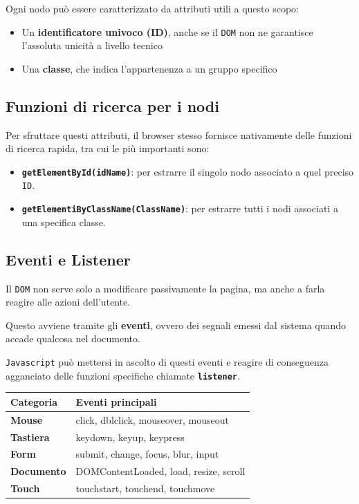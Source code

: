 Ogni nodo può essere caratterizzato da attributi utili a questo scopo:

\begin{itemize}
    \item Un \textbf{identificatore univoco (ID)}, anche se il \texttt{DOM} non ne garantisce l'assoluta unicità a livello tecnico
    \item Una \textbf{classe}, che indica l'appartenenza a un gruppo specifico
\end{itemize}

\subsection{Funzioni di ricerca per i nodi}
Per sfruttare questi attributi, il browser stesso fornisce nativamente delle funzioni di ricerca rapida, tra cui le più importanti sono:

\begin{itemize}
    \item \textbf{\texttt{getElementById(idName)}}: per estrarre il singolo nodo associato a quel preciso \texttt{ID}.
    \item \textbf{\texttt{getElementiByClassName(ClassName)}}: per estrarre tutti i nodi associati a una specifica classe.
\end{itemize}

\subsection{Eventi e Listener}
Il \texttt{DOM} non serve solo a modificare passivamente la pagina, ma anche a farla reagire alle azioni dell'utente.

Questo avviene tramite gli \textbf{eventi}, ovvero dei segnali emessi dal sistema quando accade qualcosa nel documento.

\texttt{Javascript} può mettersi in ascolto di questi eventi e reagire di conseguenza agganciato delle funzioni specifiche chiamate \textbf{\texttt{listener}}.

\begin{table}[htbp]
    \centering
    \renewcommand{\arraystretch}{1.5} %
    
    \begin{tabularx}{\textwidth}{|l|X|}
        \hline
        \textbf{Categoria} & \textbf{Eventi principali} \\ \hline
        \textbf{Mouse} & click, dblclick, mouseover, mouseout \\ \hline
        \textbf{Tastiera} & keydown, keyup, keypress \\ \hline
        \textbf{Form} & submit, change, focus, blur, input \\ \hline
        \textbf{Documento} & DOMContentLoaded, load, resize, scroll \\ \hline
        \textbf{Touch} & touchstart, touchend, touchmove \\ \hline
    \end{tabularx}
\end{table}

